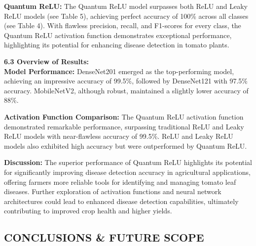 \documentclass[12pt, English]{article}
\newcommand\tab[1][1cm]{\hspace*{#1}}
\begin{document}
\begin{normalsize}
\newpage

\textbf{Quantum ReLU:} The Quantum ReLU model surpasses both ReLU and Leaky ReLU models (see Table 5), achieving perfect accuracy of 100\% across all classes (see Table 4). With flawless precision, recall, and F1-scores for every class, the Quantum ReLU activation function demonstrates exceptional performance, highlighting its potential for enhancing disease detection in tomato plants.

\newpage
\textbf{6.3 Overview of Results:} \\
\textbf{Model Performance:}
DenseNet201 emerged as the top-performing model, achieving an impressive accuracy of 99.5\%, followed by DenseNet121 with 97.5\% accuracy.
MobileNetV2, although robust, maintained a slightly lower accuracy of 88\%.

\newpage
\textbf{Activation Function Comparison:}
The Quantum ReLU activation function demonstrated remarkable performance, surpassing traditional ReLU and Leaky ReLU models with near-flawless accuracy of 99.5\%.
ReLU and Leaky ReLU models also exhibited high accuracy but were outperformed by Quantum ReLU.


\tab  
\newpage
\textbf{Discussion:}
The superior performance of Quantum ReLU highlights its potential for significantly improving disease detection accuracy in agricultural applications, offering farmers more reliable tools for identifying and managing tomato leaf diseases.
Further exploration of activation functions and neural network architectures could lead to enhanced disease detection capabilities, ultimately contributing to improved crop health and higher yields.
\newpage
\begin{center}
\section{ \Large  CONCLUSIONS \& FUTURE SCOPE}
\end{center}


\end{normalsize}
\end{document}
